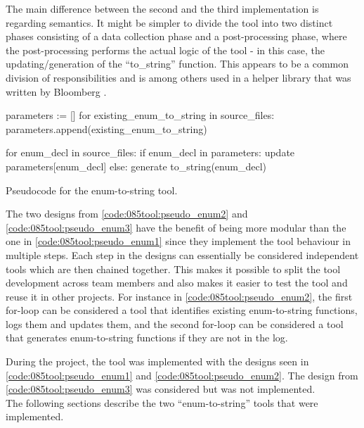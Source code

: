 The main difference between the second and the third implementation is regarding semantics. It might be simpler to divide the tool into two distinct phases consisting of a data collection phase and a post-processing phase, where the post-processing performs the actual logic of the tool - in this case, the updating/generation of the ``to\_string'' function. This appears to be a common division of responsibilities and is among others used in a helper library that was written by Bloomberg \cite{bloombergClangmetatoolFrameworkReusing2023}.

\begin{listing}[H]
    \begin{pythoncode}
parameters := []
for existing_enum_to_string in source_files:
    parameters.append(existing_enum_to_string)

for enum_decl in source_files:
    if enum_decl in parameters:
        update parameters[enum_decl]
    else:
        generate to_string(enum_decl)
    \end{pythoncode}
    \caption{Pseudocode for the enum-to-string tool.}
    \label{code:085tool:pseudo_enum3}
\end{listing}

The two designs from \cref{code:085tool:pseudo_enum2} and \cref{code:085tool:pseudo_enum3} have the benefit of being more modular than the one in \ref{code:085tool:pseudo_enum1} since they implement the tool behaviour in multiple steps.
Each step in the designs can essentially be considered independent tools which are then chained together. This makes it possible to split the tool development across team members and also makes it easier to test the tool and reuse it in other projects. For instance in \cref{code:085tool:pseudo_enum2}, the first for-loop can be considered a tool that identifies existing enum-to-string functions, logs them and updates them, and the second for-loop can be considered a tool that generates enum-to-string functions if they are not in the log.

During the project, the tool was implemented with the designs seen in \cref{code:085tool:pseudo_enum1} and \cref{code:085tool:pseudo_enum2}. The design from \cref{code:085tool:pseudo_enum3} was considered but was not implemented. \\The following sections describe the two ``enum-to-string'' tools that were implemented.